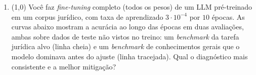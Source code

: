 \documentclass[11pt,a4paper]{article}
\begin{document}
\begin{enumerate}[1)]
\item (1{,}0) Você faz \textit{fine-tuning} completo (todos os pesos) de um LLM pré-treinado em um corpus jurídico, com taxa de aprendizado $3 \cdot 10^{-4}$ por $10$ épocas. As curvas abaixo mostram a acurácia ao longo das épocas em duas avaliações, ambas sobre dados de teste não vistos no treino: um \textit{benchmark} da tarefa jurídica alvo (linha cheia) e um \textit{benchmark} de conhecimentos gerais que o modelo dominava antes do ajuste (linha tracejada). Qual o diagnóstico mais consistente e a melhor mitigação?

\begin{center}
\end{center}


\end{enumerate}
\end{document}
